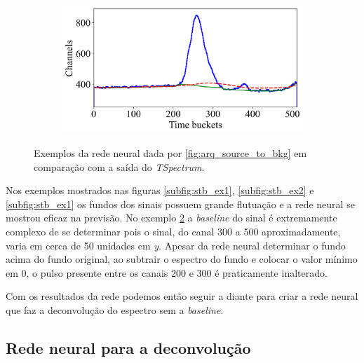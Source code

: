 \documentclass[a4paper,12pt,oneside]{book}
\begin{document}
\begin{figure}[H]
\begin{subfigure}[b]{0.49\textwidth}
        \caption{}
        \label{subfig:stb_ex3}
    \end{subfigure}%
    \hfill
    \begin{subfigure}[b]{0.46\textwidth}
        \centering
        \includegraphics[scale=0.43]{figs/stb_4.png}
        \caption{}
        \label{subfig:stb_ex4}
    \end{subfigure}
\caption{Exemplos da rede neural dada por \ref{fig:arq_source_to_bkg} em comparação com a saída do \textit{TSpectrum}.}
\label{fig:stb_examples}
\end{figure}

\par Nos exemplos mostrados nas figuras \ref{subfig:stb_ex1}, \ref{subfig:stb_ex2} e \ref{subfig:stb_ex1} os fundos dos sinais possuem grande flutuação e a rede neural se mostrou eficaz na previsão. No exemplo \ref{subfig:stb_ex4} a \textit{baseline} do sinal é extremamente complexo de se determinar pois o sinal, do canal 300 a 500 aproximadamente, varia em cerca de 50 unidades em \textit{y}. Apesar da rede neural determinar o fundo acima do fundo original, ao subtrair o espectro do fundo e colocar o valor mínimo em 0, o pulso presente entre os canais 200 e 300 é praticamente inalterado.

\par Com os resultados da rede podemos então seguir a diante para criar a rede neural que faz a deconvolução do espectro sem a \textit{baseline}.

\subsection{Rede neural para a deconvolução}

\end{document}
